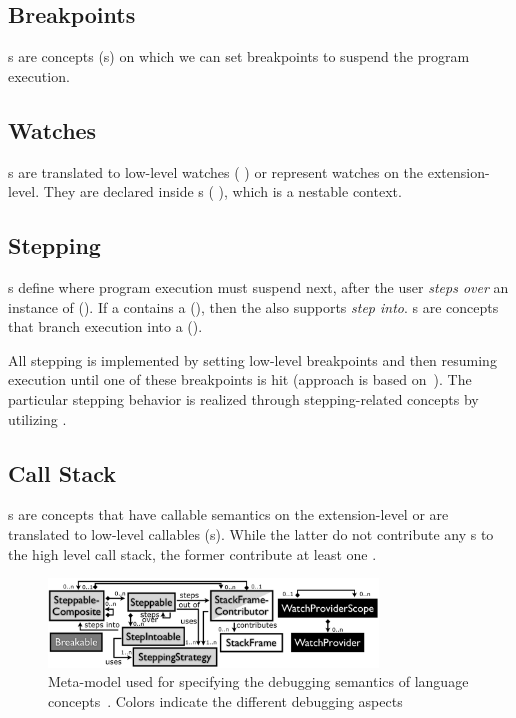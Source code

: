 \subsection{Breakpoints}
s are concepts (\eg {}s) on which
we can set breakpoints to suspend the program execution.


\subsection{Watches}

s are translated to low-level watches (\eg
{}) or represent watches on the extension-level.
They are declared inside s (\eg
{}), which is a nestable context.

\subsection{Stepping} 
s define where program execution must suspend
next, after the user \emph{steps over} 
an instance of  (\eg {}). If a
 contains a  (\eg {}), 
then the  also supports \emph{step into}. s are
concepts that branch execution into a  (\eg {}).

All stepping is implemented by setting low-level breakpoints and then resuming
execution until one of these breakpoints is hit (approach is based
on~\cite{Wu06grammar}). The particular stepping behavior is realized through 
stepping-related concepts by utilizing .

\subsection{Call Stack}
s are
concepts that have callable semantics on the extension-level or are
translated to low-level callables (\eg {}s). While the latter do
not contribute any s to the high level call stack, the former
contribute at least one .

\begin{figure}[h]
  \vspace{-2mm}
  \centering
    \includegraphics[width=8.75cm]{./figures/debugger-concepts.png} 
    \vspace{-4mm}
    \caption{Meta-model used for specifying the debugging semantics of language
    concepts~\cite{DBLP:conf/adaEurope/AdaEuropeDeb}. Colors indicate the
    different debugging aspects} 
  \label{specabs}
  \vspace{-2mm}
\end{figure}

